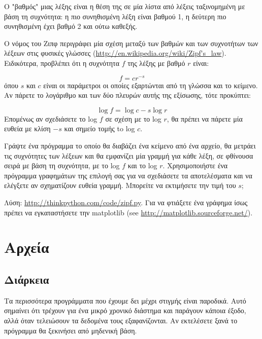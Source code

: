 \documentclass[10pt]{book}
\begin{document}
\begin{exercise}

Ο "βαθμός" μιας λέξης είναι η θέση της σε μία λίστα από λέξεις ταξινομημένη με βάση τη συχνότητα: η πιο συνηθισμένη λέξη είναι βαθμού 1, η δεύτερη πιο συνηθισμένη έχει βαθμό 2 και ούτω καθεξής.

Ο νόμος του Ζιπφ περιγράφει μία σχέση μεταξύ των βαθμών και των συχνοτήτων των λέξεων 
στις φυσικές γλώσσες (\url{http://en.wikipedia.org/wiki/Zipf's_law}). Ειδικότερα, προβλέπει ότι η 
συχνότητα $f$ της λέξης με βαθμό $r$ είναι:

\[ f = c r^{-s} \]
%
όπου $s$ και $c$ είναι οι παράμετροι οι οποίες εξαρτώνται από τη γλώσσα και το κείμενο. Αν πάρετε το λογάριθμο και των δύο πλευρών αυτής της εξίσωσης, τότε προκύπτει:

\[ \log f = \log c - s \log r \]
%
Επομένως αν σχεδιάσετε το log $f$ σε σχέση με το log $r$, θα πρέπει να πάρετε μία ευθεία με κλίση $-s$ και 
σημείο τομής  to log $c$.

Γράψτε ένα πρόγραμμα το οποίο θα διαβάζει ένα κείμενο από ένα αρχείο, θα μετράει τις συχνότητες των λέξεων και θα εμφανίζει μία γραμμή για κάθε λέξη, σε φθίνουσα σειρά με βάση τη συχνότητα, με το log $f$ και το log $r$. Χρησιμοποιήστε ένα πρόγραμμα γραφημάτων της επιλογή σας για να σχεδιάσετε τα αποτελέσματα και να ελέγξετε αν σχηματίζουν ευθεία γραμμή. Μπορείτε να εκτιμήσετε την τιμή του $s$;

Λύση: \url{http://thinkpython.com/code/zipf.py}. Για να φτιάξετε ένα γράφημα ίσως πρέπει να εγκαταστήσετε την  matplotlib (see \url{http://matplotlib.sourceforge.net/}).

\end{exercise}

 

\chapter{Αρχεία}


\section{Διάρκεια}

Τα περισσότερα προγράμματα που έχουμε δει μέχρι στιγμής είναι παροδικά. Αυτό σημαίνει
ότι τρέχουν για ένα μικρό χρονικό διάστημα και παράγουν κάποια έξοδο, αλλά όταν τελειώσουν τα δεδομένα τους εξαφανίζονται. Αν εκτελέσετε ξανά το πρόγραμμα θα ξεκινήσει από μηδενική βάση.
\end{document}
